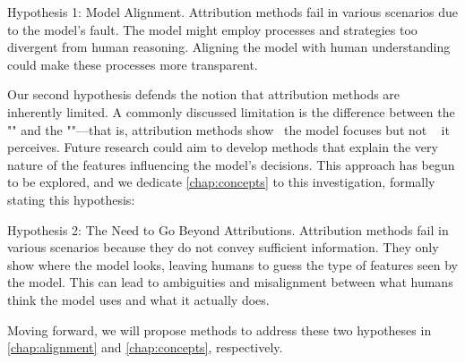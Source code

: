 \begin{customhypothesis}{Hypothesis 1: Model Alignment.}
\label{hyp:alignment}
Attribution methods fail in various scenarios due to the model's fault. The model might employ processes and strategies too divergent from human reasoning. Aligning the model with human understanding could make these processes more transparent.
\end{customhypothesis}


Our second hypothesis defends the notion that attribution methods are inherently limited. A commonly discussed limitation is the difference between the "\where" and the "\what"—that is, attribution methods show \where~the model focuses but not \what~ it perceives. Future research could aim to develop methods that explain the very nature of the features influencing the model's decisions. This approach has begun to be explored, and we dedicate \autoref{chap:concepts} to this investigation, formally stating this hypothesis:

\begin{customhypothesis}{Hypothesis 2: The Need to Go Beyond Attributions.}
\label{hyp:what}
Attribution methods fail in various scenarios because they do not convey sufficient information. They only show where the model looks, leaving humans to guess the type of features seen by the model. This can lead to ambiguities and misalignment between what humans think the model uses and what it actually does.
\end{customhypothesis}

Moving forward, we will propose methods to address these two hypotheses in \autoref{chap:alignment} and \autoref{chap:concepts}, respectively.
